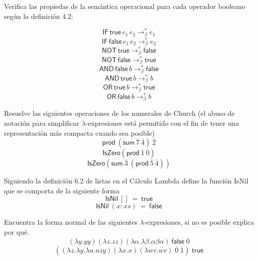 		\bigskip


                \begin{exercise}
                    Verifica las propiedas de la semántica operacional para cada operador booleano según la definición 4.2:

                        $$\mathsf{IF}\,\textsf{true}\,e_1\,e_2 \to_\beta^* e_1$$ 
                        $$\mathsf{IF}\,\textsf{false}\,e_1\,e_2 \to_\beta^* e_2$$ 
                        $$\mathsf{NOT}\,\textsf{true}\to_\beta^* \textsf{false}$$
                        $$\mathsf{NOT}\,\textsf{false}\to_\beta^* \textsf{true}$$
                        $$\mathsf{AND}\,\textsf{false}\,b\to_\beta^* \textsf{false}$$
                        $$\mathsf{AND}\,\textsf{true}\,b\to_\beta^* b$$
                        $$\mathsf{OR}\,\textsf{true}\,b\to_\beta^* \textsf{true}$$
                        $$\mathsf{OR}\,\textsf{false}\,b\to_\beta^* b$$
                        
                \end{exercise}


                \begin{exercise}
                    Resuelve las siguientes operaciones de los numerales de Church (el abuso de notación para simplificar $\lambda$-expresiones está permitido con el fin de tener una representación más compacta cuando sea posible)
                    \[
                            \textsf{prod}\ (\textsf{sum}\ \overline{7}\ \overline{4})\ \overline{2}
                    \]
                    \[
                            \textsf{IsZero} (\textsf{prod}\ \overline{1}\ \overline{0})
                    \]
                    \[
                            \textsf{IsZero}( \textsf{sum}\ \overline{3}\ (\textsf{prod}\ \overline{5}\ \overline{4}))
                    \]
                \end{exercise}  


                \begin{exercise}
                    Siguiendo la definición 6.2 de listas en el Cálculo Lambda define la función \textsf{IsNil} que se comporta de la siguiente forma
                    \[ \textsf{IsNil}\ []\ =\ \textsf{true} \]
                    \[ \textsf{IsNil}\ (x:xs)\  =\ \textsf{false}\]
                \end{exercise}


                \begin{exercise}
                    Encuentra la forma normal de las siguientes $\lambda$-expresiones, si no es posible explica por qué.\\
                    \[
                        (\lambda y.yy)(\lambda z.zz)(\lambda \alpha . \lambda \beta . \alpha \beta \alpha)\ \textsf{false} \; \overline{0}
                    \]
                    \[
                        ((\lambda z. \lambda y. \lambda u.uzy)(\lambda x.x)(\lambda wv.wv) \; \overline{0} \; \overline{1}) \; \textsf{true} 
                    \]
                \end{exercise}


